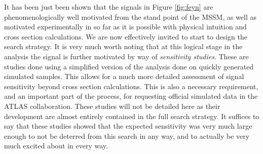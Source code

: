 It has been just been shown that the signals in Figure \ref{fig:feyn} are phenomenologically well motivated from the stand point of the \BL MSSM, as well as motivated experimentally in so far as it is possible with physical intuition and cross section calculations.
We are now effectively invited to start to design the search strategy.
It is very much worth noting that at this logical stage in the analysis the signal is further motivated by way of \emph{sensitivity studies}. 
These are studies done using a simplified version of the analysis done on quickly generated simulated samples.
This allows for a much more detailed assessment of signal sensitivity beyond cross section calculations.
This is also a necessary requirement, and an important part of the process, for requesting official simulated data in the ATLAS collaboration. 
These studies will not be detailed here as their development are almost entirely contained in the full search strategy.
It suffices to say that these studies showed that the expected sensitivity was very much large enough to not be deterred from this search in any way, and to actually be very much excited about in every way.

